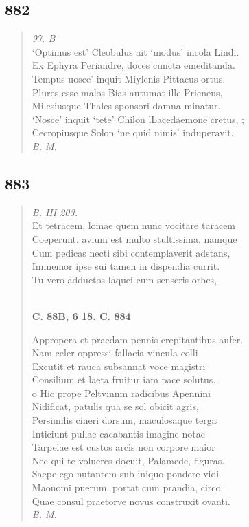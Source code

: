 \documentclass[11pt, a4paper]{report}
\begin{document}
            \subsection*{882}
      \begin{verse}
      \textit{97. B} \\ ‘Optimus est’ Cleobulus ait ‘modus’ incola Lindi. \\ Ex Ephyra Periandre, doces cuncta emeditanda. \\ Tempus uosce’ inquit Miylenis Pittacus ortus. \\ Plures esse malos Bias autumat ille Prieneus, \\ Milesiusque Thales sponsori damna minatur. \\ ‘Nosce’ inquit ‘tete’ Chilon lLacedaemone cretus, ; \\ Cecropiusque Solon ‘ne quid nimis’ induperavit. \\ \textit{B. M.} \\ 
      \end{verse}
  
            \subsection*{883}
      \begin{verse}
      \textit{B. III 203.} \\ Et tetracem, lomae quem nunc vocitare taracem \\ Coeperunt. avium est multo stultissima. namque \\ Cum pedicas necti sibi contemplaverit adstans, \\ Immemor ipse sui tamen in dispendia currit. \\ Tu vero adductos laquei cum senseris orbes, \\ 
        ﻿\pagebreak 
    \begin{center} \textbf{C. 88B, 6 18. C. 884} \end{center}Appropera et praedam pennis crepitantibus aufer. \\ Nam celer oppressi fallacia vincula colli \\ Excutit et rauca subsannat voce magistri \\ Consilium et laeta fruitur iam pace solutus. \\ o Hic prope Peltvinnm radicibus Apennini \\ Nidificat, patulis qua se sol obicit agris, \\ Persimilis cineri dorsum, maculosaque terga \\ Inticiunt pullae cacabantis imagine notae \\ Tarpeiae est custos arcis non corpore maior \\ Nec qui te volucres docuit, Palamede, figuras. \\ Saepe ego nutantem sub iniquo pondere vidi \\ Maonomi puerum, portat cum prandia, circo \\ Quae consul praetorve novus construxit ovanti. \\ \textit{B. M.} \\ 
      \end{verse}
  
\end{document}
